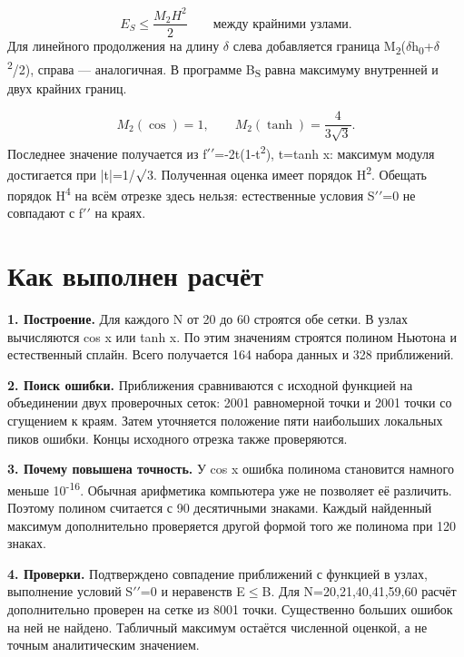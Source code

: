 \documentclass[12pt,a4paper]{article}
\begin{document}
\[
E_S\leq\frac{M_2H^2}{2}\qquad\text{между крайними узлами}.
\]
Для линейного продолжения на длину \ensuremath{\delta} слева добавляется граница M\textsubscript{2}(\ensuremath{\delta}h\textsubscript{0}+\ensuremath{\delta}\textsuperscript{2}/2), справа — аналогичная. В программе B\textsubscript{S} равна максимуму внутренней и двух крайних границ.

\[
M_2(\cos)=1,\qquad M_2(\tanh)=\frac{4}{3\sqrt{3}}.
\]
Последнее значение получается из f\ensuremath{\prime\prime}=-2t(1-t\textsuperscript{2}), t=tanh x: максимум модуля достигается при |t|=1/\ensuremath{\surd}3. Полученная оценка имеет порядок H\textsuperscript{2}. Обещать порядок H\textsuperscript{4} на всём отрезке здесь нельзя: естественные условия S\ensuremath{\prime\prime}=0 не совпадают с f\ensuremath{\prime\prime} на краях.

\clearpage
\section{Как выполнен расчёт}
\textbf{1. Построение.} Для каждого N от 20 до 60 строятся обе сетки. В узлах вычисляются cos x или tanh x. По этим значениям строятся полином Ньютона и естественный сплайн. Всего получается 164 набора данных и 328 приближений.

\textbf{2. Поиск ошибки.} Приближения сравниваются с исходной функцией на объединении двух проверочных сеток: 2001 равномерной точки и 2001 точки со сгущением к краям. Затем уточняется положение пяти наибольших локальных пиков ошибки. Концы исходного отрезка также проверяются.

\textbf{3. Почему повышена точность.} У cos x ошибка полинома становится намного меньше 10\textsuperscript{-16}. Обычная арифметика компьютера уже не позволяет её различить. Поэтому полином считается с 90 десятичными знаками. Каждый найденный максимум дополнительно проверяется другой формой того же полинома при 120 знаках.

\textbf{4. Проверки.} Подтверждено совпадение приближений с функцией в узлах, выполнение условий S\ensuremath{\prime\prime}=0 и неравенств E\ensuremath{\leq}B. Для N=20,21,40,41,59,60 расчёт дополнительно проверен на сетке из 8001 точки. Существенно больших ошибок на ней не найдено. Табличный максимум остаётся численной оценкой, а не точным аналитическим значением.
\end{document}
